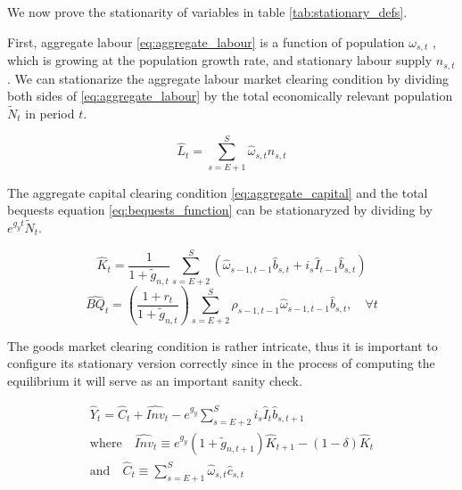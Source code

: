 We now prove the stationarity of variables in table \textcolor{Fuchsia}{\ref{tab:stationary_defs}}.

First, aggregate labour \textcolor{Fuchsia}{\eqref{eq:aggregate_labour}} is a function of population $\omega_{s,t}$ , which is growing at the population growth rate, and stationary labour supply $n_{s,t}$. We can stationarize the aggregate labour market clearing condition
by dividing both sides of \textcolor{Fuchsia}{\eqref{eq:aggregate_labour}} by the total economically relevant population $\tilde{N}_t$ in period $t$.

\begin{equation}\label{eq:aggregate_labour_stat}
    \hat{L}_t = \sum_{s=E+1}^{S} \hat{\omega}_{s,t} n_{s,t}
\end{equation}

The aggregate capital clearing condition \textcolor{Fuchsia}{\eqref{eq:aggregate_capital}} and the total bequests equation \textcolor{Fuchsia}{\eqref{eq:bequests_function}} can be stationaryzed by dividing by $e^{g_y t}\tilde{N}_t$.

\begin{equation}\label{eq:aggregate_capital_stat}
    \hat{K}_t = \frac{1}{1+\tilde{g}_{n,t}} \sum_{s=E+2}^{S} \left( \hat{\omega}_{s-1,t-1} \hat{b}_{s,t} + i_s \hat{I}_{t-1} \hat{b}_{s,t} \right)
\end{equation}
\begin{equation}\label{eq:bequests_stat}
    \hat{BQ}_t = \left( \frac{1+r_t}{1+\tilde{g}_{n,t}} \right) \sum^S_{s=E+2}\rho_{s-1, t-1}\hat{\omega}_{s-1,t-1}\hat{b}_{s,t}, \quad \forall t
\end{equation}

The goods market clearing condition is rather intricate, thus it is important to configure its stationary version correctly since in the process of computing the equilibrium it will serve as an important sanity check.

\begin{equation}\label{eq:clearing_output_stat}
    \begin{aligned}
      \hat{Y}_t = \hat{C}_t + \hat{Inv}_t - e^{g_y} \sum_{s=E+2}^{S} i_s \hat{I}_t \hat{b}_{s,t+1}
      \\
      \text{where} \quad \hat{Inv}_t \equiv e^{g_y}(1+\tilde{g}_{n,t+1})\hat{K}_{t+1} - (1 - \delta) \hat{K}_t
      \\
      \text{and} \quad \hat{C}_t \equiv \sum_{s=E+1}^{S} \hat{\omega}_{s,t} \hat{c}_{s,t}
    \end{aligned}
\end{equation}

